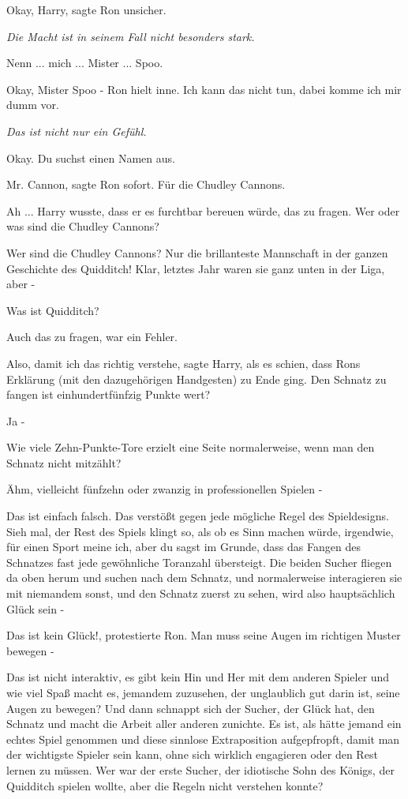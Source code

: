 \glqq{}Okay, Harry\grqq{}, sagte Ron unsicher.

\emph{Die Macht ist in seinem Fall nicht besonders stark.}

\glqq{}Nenn ... mich ... Mister ... Spoo.\grqq{}

\glqq{}Okay, Mister Spoo -\grqq{} Ron hielt inne. \glqq{}Ich kann das nicht tun,
dabei komme ich mir dumm vor.\grqq{}

\emph{Das ist nicht nur ein Gefühl.}

\glqq{}Okay. Du suchst einen Namen aus.\grqq{}

\glqq{}Mr. Cannon\grqq{}, sagte Ron sofort. \glqq{}Für die Chudley
Cannons.\grqq{}

\glqq{}Ah ...\grqq{} Harry wusste, dass er es furchtbar bereuen würde, das zu
fragen. \glqq{}Wer oder was sind die Chudley Cannons?\grqq{}

\glqq{}Wer sind die Chudley Cannons? Nur die brillanteste Mannschaft in der
ganzen Geschichte des Quidditch! Klar, letztes Jahr waren sie ganz unten in der
Liga, aber -\grqq{}

\glqq{}Was ist Quidditch?\grqq{}

Auch das zu fragen, war ein Fehler.

\glqq{}Also, damit ich das richtig verstehe\grqq{}, sagte Harry, als es schien,
dass Rons Erklärung (mit den dazugehörigen Handgesten) zu Ende ging. \glqq{}Den
Schnatz zu fangen ist einhundertfünfzig Punkte wert?\grqq{}

\glqq{}Ja -\grqq{}

\glqq{}Wie viele Zehn-Punkte-Tore erzielt eine Seite normalerweise, wenn man den
Schnatz nicht mitzählt?\grqq{}

\glqq{}Ähm, vielleicht fünfzehn oder zwanzig in professionellen Spielen -\grqq{}

\glqq{}Das ist einfach falsch. Das verstößt gegen jede mögliche Regel des
Spieldesigns. Sieh mal, der Rest des Spiels klingt so, als ob es Sinn machen
würde, irgendwie, für einen Sport meine ich, aber du sagst im Grunde, dass das
Fangen des Schnatzes fast jede gewöhnliche Toranzahl übersteigt. Die beiden
Sucher fliegen da oben herum und suchen nach dem Schnatz, und normalerweise
interagieren sie mit niemandem sonst, und den Schnatz zuerst zu sehen, wird also
hauptsächlich Glück sein -\grqq{}

\glqq{}Das ist kein Glück!\grqq{}, protestierte Ron. \glqq{}Man muss seine Augen
im richtigen Muster bewegen -\grqq{}

\glqq{}Das ist nicht interaktiv, es gibt kein Hin und Her mit dem anderen
Spieler und wie viel Spaß macht es, jemandem zuzusehen, der unglaublich gut
darin ist, seine Augen zu bewegen? Und dann schnappt sich der Sucher, der Glück
hat, den Schnatz und macht die Arbeit aller anderen zunichte. Es ist, als hätte
jemand ein echtes Spiel genommen und diese sinnlose Extraposition aufgepfropft,
damit man der wichtigste Spieler sein kann, ohne sich wirklich engagieren oder
den Rest lernen zu müssen. Wer war der erste Sucher, der idiotische Sohn des
Königs, der Quidditch spielen wollte, aber die Regeln nicht verstehen
konnte?\grqq{}


